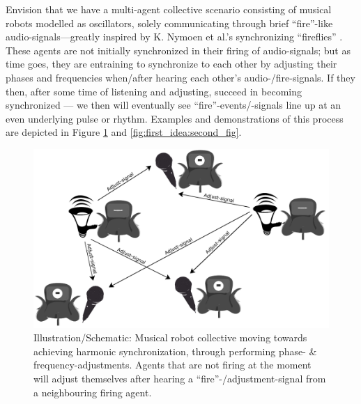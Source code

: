 	Envision that we have a multi-agent collective scenario consisting of musical robots modelled as oscillators, solely communicating through brief ``fire''-like audio-signals—greatly inspired by K. Nymoen et al.'s synchronizing ``fireflies'' \cite{nymoen_synch}. These agents are not initially synchronized in their firing of audio-signals; but as time goes, they are entraining to synchronize to each other by adjusting their phases and frequencies when/after hearing each other's audio-/fire-signals. If they then, after some time of listening and adjusting, succeed in becoming synchronized — we then will eventually see ``fire''-events/-signals line up at an even underlying pulse or rhythm. Examples and demonstrations of this process are depicted in Figure \ref{fig:first_idea:first_fig} and \ref{fig:first_idea:second_fig}.

	\begin{figure}[h]
	\centering
	\includegraphics[width=0.9\linewidth]{Assets/Figures/schematic_initial_idea.pdf}
	\caption{Illustration/Schematic: Musical robot collective moving towards achieving harmonic synchronization, through performing phase- \& frequency-adjustments. Agents that are not firing at the moment will adjust themselves after hearing a ``fire''-/adjustment-signal from a neighbouring firing agent.}
	\label{fig:first_idea:first_fig}
	\end{figure}

